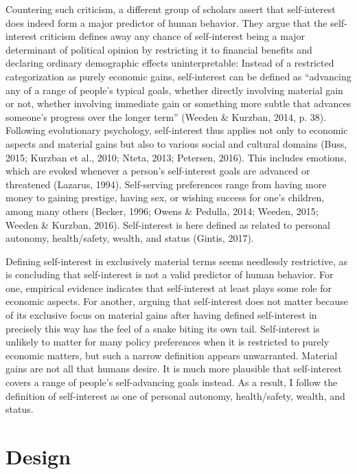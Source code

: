 \documentclass[12pt,econ]{sources/authesis}
\begin{document}
Countering such criticism, a different group of scholars assert that self-interest does indeed form a major predictor of human behavior. They argue that the self-interest criticism defines away any chance of self-interest being a major determinant of political opinion by restricting it to financial benefits and declaring ordinary demographic effects uninterpretable: Instead of a restricted categorization as purely economic gains, self-interest can be defined as ``advancing any of a range of people's typical goals, whether directly involving material gain or not, whether involving immediate gain or something more subtle that advances someone's progress over the longer term'' (Weeden \& Kurzban, 2014, p. 38). Following evolutionary psychology, self-interest thus applies not only to economic aspects and material gains but also to various social and cultural domains (Buss, 2015; Kurzban et al., 2010; Nteta, 2013; Petersen, 2016). This includes emotions, which are evoked whenever a person's self-interest goals are advanced or threatened (Lazarus, 1994). Self-serving preferences range from having more money to gaining prestige, having sex, or wishing success for one's children, among many others (Becker, 1996; Owens \& Pedulla, 2014; Weeden, 2015; Weeden \& Kurzban, 2016). Self-interest is here defined as related to personal autonomy, health/safety, wealth, and status (Gintis, 2017).

Defining self-interest in exclusively material terms seems needlessly restrictive, as is concluding that self-interest is not a valid predictor of human behavior. For one, empirical evidence indicates that self-interest at least plays some role for economic aspects. For another, arguing that self-interest does not matter because of its exclusive focus on material gains after having defined self-interest in precisely this way has the feel of a snake biting its own tail. Self-interest is unlikely to matter for many policy preferences when it is restricted to purely economic matters, but such a narrow definition appears unwarranted. Material gains are not all that humans desire. It is much more plausible that self-interest covers a range of people's self-advancing goals instead. As a result, I follow the definition of self-interest as one of personal autonomy, health/safety, wealth, and status.

\hypertarget{framing-design}{%
\section{Design}\label{framing-design}}
\end{document}
